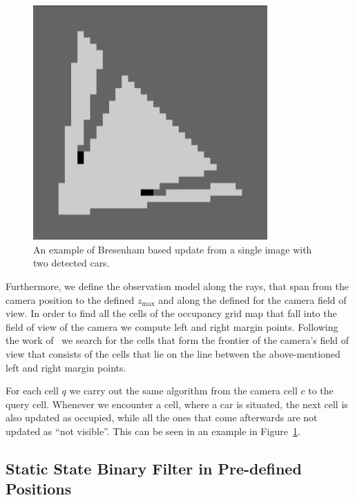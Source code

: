 \begin{figure}
\begin{center}
\includegraphics[width=0.8\textwidth]{pictures/testmap.png}
\end{center}
\vspace{-10pt}
\caption{An example of Bresenham based update from a single image with two detected cars.}
\vspace{-10pt}
\label{fig:maptest}
\end{figure}

Furthermore, we define the observation model along the rays, that span from
the camera position to the defined $z_{\max}$ and along the defined for the
camera field of view. In order to find all the cells of the occupancy grid map
that fall into the field of view of the camera we compute left and right
margin points. Following the work of~\citet{bresenham1965} we search for the
cells that form the frontier of the camera's field of view that consists of
the cells that lie on the line between the above-mentioned left and right
margin points.

For each cell $q$ we carry out the same algorithm from the camera cell $c$ to
the query cell. Whenever we encounter a cell, where a car is situated, the
next cell is also updated as occupied, while all the ones that come afterwards
are not updated as ``not visible''. This can be seen in an example in
Figure~\ref{fig:maptest}.

\subsection{Static State Binary Filter in Pre-defined Positions}
\label{sub:static_state_binary_filter_in_pre_defined_positions}

